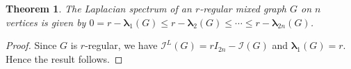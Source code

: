 \documentclass[12pt]{article}
\numberwithin{equation}{section}
\newtheorem{thm}{Theorem}[section]
\begin{document}
	\begin{thm}\label{thm-lapspectrum-regular}
		The Laplacian spectrum of an $r$-regular mixed graph $G$ on $n$ vertices is given by $0=r-\bm{\lambda}_1(G)\leq r-\bm{\lambda}_2(G)\leq\cdots\leq r-\bm{\lambda}_{2n}(G)$.
	\end{thm}
	\begin{proof}
		Since $G$ is $r$-regular, we have $\mathcal{I}^L(G)=rI_{2n}-\mathcal{I}(G)$ and $\bm{\lambda}_1(G)=r$. Hence the result follows.
	\end{proof}
	
	
	
\end{document}
